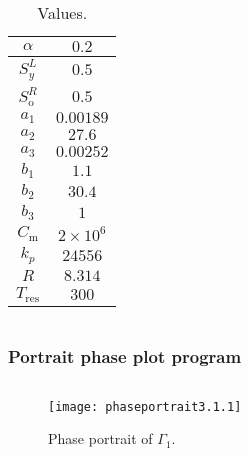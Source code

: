 \documentclass[
    8pt,
    aspectratio=1610,
    c,
    intlimits,
    leqno,
    professionalfonts,
]{beamer}
\begin{document}
\begin{frame}[fragile]
	\begin{columns}
		\begin{column}{0.51\textwidth}
			\begin{table}[ht!]
				\begin{tabular}{cc}
					\hline
					$\alpha$           & $0.2$            \\
					\hline
					$S^{L}_{y}$        & $0.5$            \\
					\hline
					$S^{R}_{\text{o}}$ & $0.5$            \\
					\hline
					$a_{1}$            & $0.00189$        \\
					\hline
					$a_{2}$            & $27.6$           \\
					\hline
					$a_{3}$            & $0.00252$        \\
					\hline
					$b_{1}$            & $1.1$            \\
					\hline
					$b_{2}$            & $30.4$           \\
					\hline
					$b_{3}$            & $1$              \\
					\hline
					$C_{\text{m}}$     & $2\times 10^{6}$ \\
					\hline
					$k_{p}$            & $24556$          \\
					\hline
					$R$                & $8.314$          \\
					\hline
					$T_{\text{res}}$   & $300$            \\
					\hline
				\end{tabular}
				\caption{Values.}
			\end{table}
		\end{column}
		\begin{column}{0.45\textwidth}
			\inputminted[fontsize=\tiny]{text}{calculations.txt}
		\end{column}
	\end{columns}
\end{frame}

\begin{frame}[fragile]
	\frametitle{Portrait phase plot program}
	\inputminted[fontsize=\tiny,firstline=1,lastline=25]{python}{phaseportrait.py}
\end{frame}

\begin{frame}
	\begin{figure}[ht!]
		\centering
		\texttt{[image: phaseportrait3.1.1]}
		\caption{Phase portrait of $\Gamma_{1}$.}
	\end{figure}
\end{frame}
\end{document}
